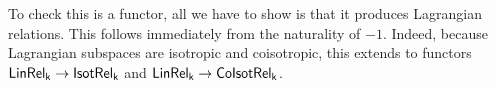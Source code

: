 \begin{lemma}
\end{lemma}


To check this is a functor, all we have to show is that it produces Lagrangian relations. This follows immediately from the naturality of $-1$.
Indeed, because Lagrangian subspaces are isotropic and coisotropic, this extends to functors $\sf LinRel_k\to{\sf Isot}\mathsf{Rel}_k$ and $\sf LinRel_k\to{\sf Co}{\sf Isot}\mathsf{Rel}_k$.


